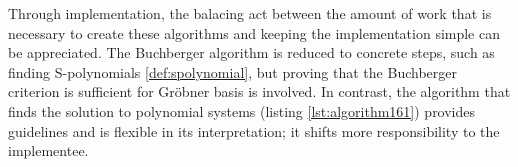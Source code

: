 Through implementation, the balacing act between the amount of work that is necessary to create these algorithms and keeping the implementation simple can be appreciated. The Buchberger algorithm is reduced to concrete steps, such as finding S-polynomials \ref{def:spolynomial}, but proving that the Buchberger criterion is sufficient for Gröbner basis is involved. In contrast, the algorithm that finds the solution to polynomial systems (listing \ref{lst:algorithm161}) provides guidelines and is flexible in its interpretation; it shifts more responsibility to the implementee. 
